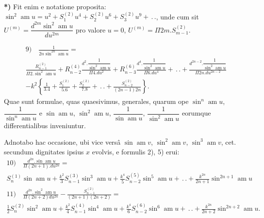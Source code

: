 \documentclass{article}
\begin{document}
\textbf{*)} Fit enim e notatione proposita: $\sin^{2}\operatorname{am}u=u^{2}+S_{1}^{(2)}u^{4}+S_{2}^{(2)}u^{6}+S_{3}^{(2)}u^{9}+\,.\,.$, unde cum sit $U^{(m)}=\dfrac{d^{2m}\sin^{2}\operatorname{am}u}{du^{2m}}$ pro valore $u=0$, $U^{(m)}=\Pi 2m.S_{m-1}^{(2)}$.

\[
\begin{gathered}
\text{9)}\quad\frac{1}{2n\sin^{2n}\operatorname{am}u}=\\[1.5ex]
\frac{R_{n-1}^{(2)}}{\Pi 2.\sin^{2}\operatorname{am}u}+R_{n-2}^{(4)}\frac{d^{2}.\dfrac{1}{\sin^{2}\operatorname{am}u}}{\Pi 4.du^{2}}+R_{n-3}^{(6)}\frac{d^{4}.\dfrac{1}{\sin^{2}\operatorname{am}u}}{\Pi 6.du^{4}}+\,.\,.+\frac{d^{2n-2}.\dfrac{1}{\sin^{2}\operatorname{am}u}}{\Pi 2n.du^{2n-2}}\\[1.5ex]
-k^{2}\left\{\frac{1}{3.4}+\frac{S_{1}^{(2)}}{5.6}+\frac{S_{2}^{(2)}}{7.8}+\,.\,.+\frac{S_{n-2}^{(2)}}{(2n-1)2n}\right\}.
\end{gathered}
\]
Quae sunt formulae, quas quaesivimus, generales, quarum ope $\sin^{n}\operatorname{am}u$, $\dfrac{1}{\sin^{n}\operatorname{am}u}$ e $\sin\operatorname{am}u$, $\sin^{2}\operatorname{am}u$, $\dfrac{1}{\sin\operatorname{am}u}$, $\dfrac{1}{\sin^{2}\operatorname{am}u}$ eorumque differentialibus inveniuntur.

Adnotabo hac occasione, ubi vice versâ $\sin\operatorname{am}v$, $\sin^{2}\operatorname{am}v$, $\sin^{3}\operatorname{am}v$, cet. secundum dignitates ipsius $x$ evolvis, e formulis 2), 5) erui:
\[
\begin{gathered}
\text{10)}\quad\frac{d^{2n}.\sin\operatorname{am}u}{\Pi(2n+1).du^{2n}}=\\[1.5ex]
S_{n}^{(1)}\sin\operatorname{am}u+\frac{k^{2}}{3}S_{n-1}^{(3)}\sin^{3}\operatorname{am}u+\frac{k^{4}}{5}S_{n-2}^{(5)}\sin^{5}\operatorname{am}u+\,.\,.+\frac{k^{2n}}{2n+1}\sin^{2n+1}\operatorname{am}u\\[1.5ex]
\text{11)}\quad\frac{d^{2n}.\sin^{2}\operatorname{am}u}{\Pi(2n+2)du^{2n}}-\frac{S_{n-1}^{(2)}}{(2n+1)(2n+2)}=\\[1.5ex]
\frac{1}{2}S_{n}^{(2)}\sin^{2}\operatorname{am}u+\frac{k^{2}}{4}S_{n-1}^{(4)}\sin^{4}\operatorname{am}u+\frac{k^{4}}{6}S_{n-2}^{(6)}\sin^{6}\operatorname{am}u+\,.\,.+\frac{k^{2n}}{2n+2}\sin^{2n+2}\operatorname{am}u.
\end{gathered}
\]
\end{document}
